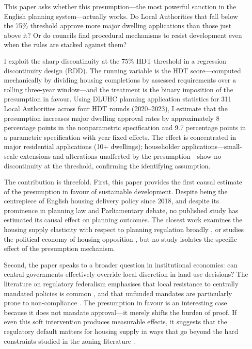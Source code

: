 \documentclass[12pt]{article}
\begin{document}
This paper asks whether this presumption---the most powerful sanction in the English planning system---actually works. Do Local Authorities that fall below the 75\% threshold approve more major dwelling applications than those just above it? Or do councils find procedural mechanisms to resist development even when the rules are stacked against them?

I exploit the sharp discontinuity at the 75\% HDT threshold in a regression discontinuity design (RDD). The running variable is the HDT score---computed mechanically by dividing housing completions by assessed requirements over a rolling three-year window---and the treatment is the binary imposition of the presumption in favour. Using DLUHC planning application statistics for 311 Local Authorities across four HDT rounds (2020--2023), I estimate that the presumption increases major dwelling approval rates by approximately 8 percentage points in the nonparametric specification and 9.7 percentage points in a parametric specification with year fixed effects. The effect is concentrated in major residential applications (10+ dwellings); householder applications---small-scale extensions and alterations unaffected by the presumption---show no discontinuity at the threshold, confirming the identifying assumption.

The contribution is threefold. First, this paper provides the first causal estimate of the presumption in favour of sustainable development. Despite being the centrepiece of English housing delivery policy since 2018, and despite its prominence in planning law and Parliamentary debate, no published study has estimated its causal effect on planning outcomes. The closest work examines the housing supply elasticity with respect to planning regulation broadly \citep{hilber2016}, or studies the political economy of housing opposition \citep{dehring2008, brunner2006, fischel2001}, but no study isolates the specific effect of the presumption mechanism.

Second, the paper speaks to a broader question in institutional economics: can central governments effectively override local discretion in land-use decisions? The literature on regulatory federalism emphasises that local resistance to centrally mandated policies is common \citep{oates1999, fischel2001}, and that unfunded mandates are particularly prone to non-compliance \citep{inman2008}. The presumption in favour is an interesting case because it does not mandate approval---it merely shifts the burden of proof. If even this soft intervention produces measurable effects, it suggests that the regulatory default matters for housing supply in ways that go beyond the hard constraints studied in the zoning literature \citep{glaeser2005, turner2014}.
\end{document}
